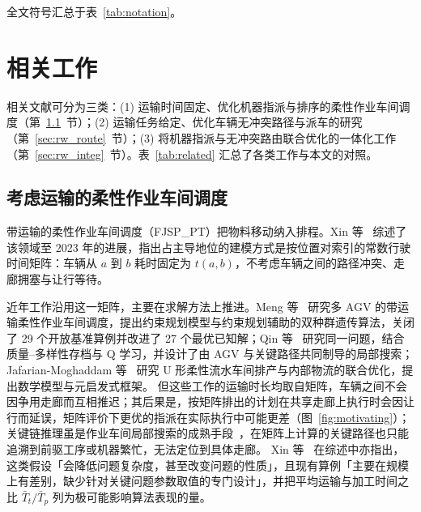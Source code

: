 \documentclass[manuscript,screen,review]{acmart}
\begin{document}
全文符号汇总于表~\ref{tab:notation}。



\section{相关工作}
\label{sec:Chapter_II}

相关文献可分为三类：(1) 运输时间固定、优化机器指派与排序的柔性作业车间调度（第~\ref{sec:rw_fjsp}~节）；(2) 运输任务给定、优化车辆无冲突路径与派车的研究（第~\ref{sec:rw_route}~节）；(3) 将机器指派与无冲突路由联合优化的一体化工作（第~\ref{sec:rw_integ}~节）。表~\ref{tab:related} 汇总了各类工作与本文的对照。

\subsection{考虑运输的柔性作业车间调度}
\label{sec:rw_fjsp}

带运输的柔性作业车间调度（FJSP\_PT）把物料移动纳入排程。Xin 等~\cite{xin2025review} 综述了该领域至 2023 年的进展，指出占主导地位的建模方式是按位置对索引的常数行驶时间矩阵：车辆从 $a$ 到 $b$ 耗时固定为 $t(a,b)$，不考虑车辆之间的路径冲突、走廊拥塞与让行等待。

近年工作沿用这一矩阵，主要在求解方法上推进。Meng 等~\cite{meng2025cp} 研究多 AGV 的带运输柔性作业车间调度，提出约束规划模型与约束规划辅助的双种群遗传算法，关闭了 29 个开放基准算例并改进了 27 个最优已知解；Qin 等~\cite{qin2026knowledge} 研究同一问题，结合质量--多样性存档与 Q 学习，并设计了由 AGV 与关键路径共同制导的局部搜索；Jafarian-Moghaddam 等~\cite{jafarian2026integrated} 研究 U 形柔性流水车间排产与内部物流的联合优化，提出数学模型与元启发式框架。
但这些工作的运输时长均取自矩阵，车辆之间不会因争用走廊而互相推迟；其后果是，按矩阵排出的计划在共享走廊上执行时会因让行而延误，矩阵评价下更优的指派在实际执行中可能更差（图~\ref{fig:motivating}）；关键链推理虽是作业车间局部搜索的成熟手段~\cite{otala2021graph,tamssaouet2023neighborhood}，在矩阵上计算的关键路径也只能追溯到前驱工序或机器繁忙，无法定位到具体走廊。
Xin 等~\cite{xin2025review} 在综述中亦指出，这类假设「会降低问题复杂度，甚至改变问题的性质」，且现有算例「主要在规模上有差别，缺少针对关键问题参数取值的专门设计」，并把平均运输与加工时间之比 $\bar{T}_t/\bar{T}_p$ 列为极可能影响算法表现的量。
\end{document}
